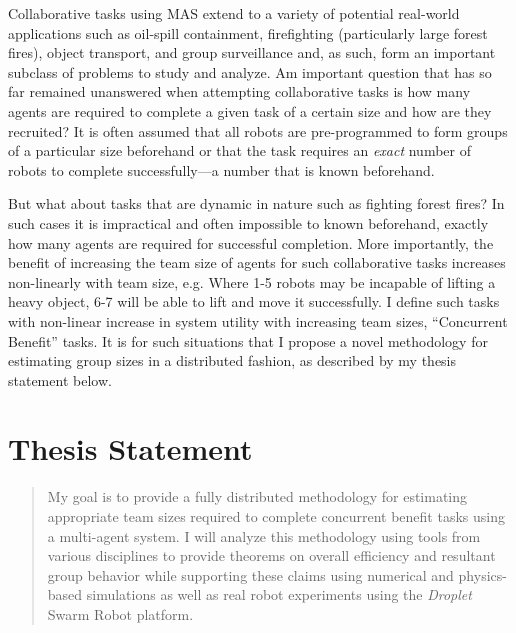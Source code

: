 \documentclass[11pt, onecolumn, compsoc, letterpaper]{article}
\begin{document}
Collaborative tasks using MAS extend to a variety of potential real-world applications such as oil-spill containment, firefighting (particularly large forest fires), object transport, and group surveillance and, as such, form an important subclass of problems to study and analyze. Am important question that has so far remained unanswered when attempting collaborative tasks is how many agents are required to complete a given task of a certain size and how are they recruited? It is often assumed that all robots are pre-programmed to form groups of a particular size beforehand or that the task requires an \emph{exact} number of robots to complete successfully---a number that is known beforehand. 

But what about tasks that are dynamic in nature such as fighting forest fires? In such cases it is impractical and often impossible to known beforehand, exactly how many agents are required for successful completion. More importantly, the benefit of increasing the team size of agents for such collaborative tasks increases non-linearly with team size, e.g. Where 1-5 robots may be incapable of lifting a heavy object, 6-7 will be able to lift and move it successfully. I define such tasks with non-linear increase in system utility with increasing team sizes, ``Concurrent Benefit'' tasks. It is for such situations that I propose a novel methodology for estimating group sizes in a distributed fashion, as described by my thesis statement below.

\section{Thesis Statement}
\begin{quote}
My goal is to provide a fully distributed methodology for estimating appropriate team sizes required to complete concurrent benefit tasks using a multi-agent system. I will analyze this methodology using tools from various disciplines to provide theorems on overall efficiency and resultant group behavior while supporting these claims using numerical and physics-based simulations as well as real robot experiments using the \emph{Droplet} Swarm Robot platform.
\end{quote}
\end{document}
